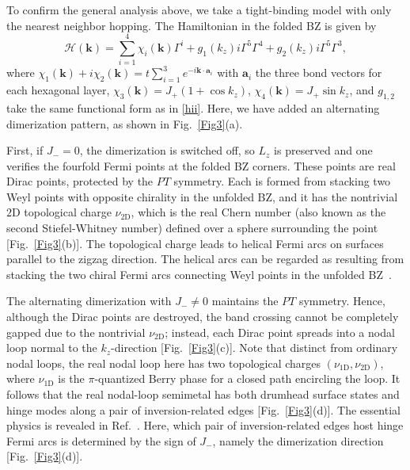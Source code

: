 \documentclass[aps,prl,twocolumn,noshowpacs,superscriptaddress]{revtex4-1}
\def \H {\mathcal{H}}
\begin{document}
To confirm the general analysis above, we take a tight-binding model with only the nearest neighbor hopping. The Hamiltonian in the folded BZ is given by~\cite{Note_Hamiltonian}
\begin{equation}\label{h-g-ii}
\H(\bm{k})=\sum_{i=1}^{4}\chi_i(\bm{k})\Gamma^i + g_1(k_z) i\Gamma^5\Gamma^4+g_2(k_z) i\Gamma^5\Gamma^3,
\end{equation}
where $\chi_1(\bm{k})+i\chi_2(\bm{k})=t\sum_{i=1}^{3}e^{-i\bm{k}\cdot\bm{a}_i} $ with $ \bm{a}_i $ the three bond vectors for each hexagonal layer, $\chi_{3}(\bm{k})=J_+(1+\cos k_z) $, $\chi_{4}(\bm{k})=J_+\sin k_z $, and $ g_{1,2} $ take the same functional form as in \eqref{hii}. Here, we have added an alternating dimerization pattern, as shown in Fig.~\ref{Fig3}(a).

First, if $J_{-}=0$, the dimerization is switched off, so $L_z$ is preserved and one verifies the fourfold Fermi points at the folded BZ corners. These points are real Dirac points, protected by the $PT$ symmetry. Each is formed from stacking two Weyl points with opposite chirality in the unfolded BZ, and it has the nontrivial $2$D topological charge $\nu_\text{2D}$, which is the real Chern number (also known as the second Stiefel-Whitney number) defined over a sphere surrounding the point [Fig.~\ref{Fig3}(b)]. The topological charge leads to helical Fermi arcs on surfaces parallel to the zigzag direction. The helical arcs can be regarded as resulting from stacking the two chiral Fermi arcs connecting Weyl points in the unfolded BZ~\cite{SM}.

The alternating dimerization with $J_{-}\ne 0$ maintains the $PT$ symmetry. Hence, although the Dirac points are destroyed, the band crossing cannot be completely gapped due to the nontrivial $\nu_\text{2D}$; instead, each Dirac point spreads into a nodal loop normal to the $k_z$-direction [Fig.~\ref{Fig3}(c)]. Note that distinct from ordinary nodal loops, the real nodal loop here has two topological charges $(\nu_\text{1D},\nu_\text{2D})$, where $\nu_\text{1D}$ is the $\pi$-quantized Berry phase for a closed path encircling the loop. It follows that the real nodal-loop semimetal has both drumhead surface states and hinge modes along a pair of inversion-related edges [Fig.~\ref{Fig3}(d)]. The essential physics is revealed in Ref.~\cite{Wang2020}. Here, which pair of inversion-related edges host hinge Fermi arcs is determined by the sign of $J_{-}$, namely the dimerization direction [Fig.~\ref{Fig3}(d)].
\end{document}
